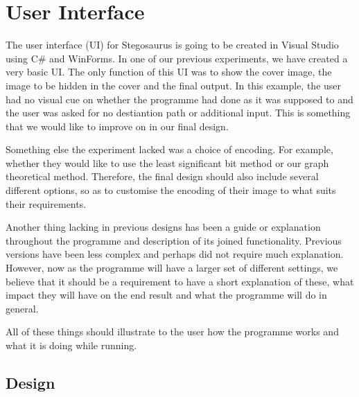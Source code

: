 \section{User Interface}

The user interface (UI) for Stegosaurus is going to be created in Visual Studio using C\# and WinForms.
In one of our previous experiments, we have created a very basic UI.
The only function of this UI was to show the cover image, the image to be hidden in the cover and the final output.
In this example, the user had no visual cue on whether the programme had done as it was supposed to and the user was asked for no destiantion path or additional input.
This is something that we would like to improve on in our final design.

Something else the experiment lacked was a choice of encoding.
For example, whether they would like to use the least significant bit method or our graph theoretical method.
Therefore, the final design should also include several different options, so as to customise the encoding of their image to what suits their requirements.

Another thing lacking in previous designs has been a guide or explanation throughout the programme and description of its joined functionality.
Previous versions have been less complex and perhaps did not require much explanation.
However, now as the programme will have a larger set of different settings, we believe that it should be a requirement to have a short explanation of these, what impact they will have on the end result and what the programme will do in general.

All of these things should illustrate to the user how the programme works and what it is doing while running.

\subsection{Design}

